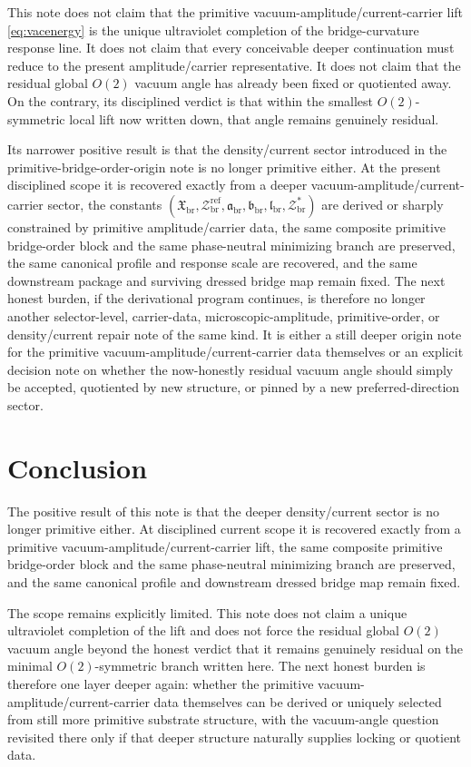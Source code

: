 \documentclass[11pt]{article}
\newcommand{\RespDeepDensityRef}{\mathcal Z_{\mathrm{br}}^{\mathrm{ref}}}
\newcommand{\RespDeepDensityEq}{\mathcal Z_{\mathrm{br}}^{\ast}}
\newcommand{\RespDeepReadout}{\mathfrak X_{\mathrm{br}}}
\newcommand{\RespDeepTrack}{\mathfrak a_{\mathrm{br}}}
\newcommand{\RespDeepRelax}{\mathfrak b_{\mathrm{br}}}
\newcommand{\RespDeepWell}{\mathfrak l_{\mathrm{br}}}
\begin{document}
This note does not claim that the primitive vacuum-amplitude/current-carrier lift \eqref{eq:vacenergy} is the unique ultraviolet completion of the bridge-curvature response line. It does not claim that every conceivable deeper continuation must reduce to the present amplitude/carrier representative. It does not claim that the residual global \(O(2)\) vacuum angle has already been fixed or quotiented away. On the contrary, its disciplined verdict is that within the smallest \(O(2)\)-symmetric local lift now written down, that angle remains genuinely residual.

Its narrower positive result is that the density/current sector introduced in the primitive-bridge-order-origin note is no longer primitive either. At the present disciplined scope it is recovered exactly from a deeper vacuum-amplitude/current-carrier sector, the constants \((\RespDeepReadout,\RespDeepDensityRef,\RespDeepTrack,\RespDeepRelax,\RespDeepWell,\RespDeepDensityEq)\) are derived or sharply constrained by primitive amplitude/carrier data, the same composite primitive bridge-order block and the same phase-neutral minimizing branch are preserved, the same canonical profile and response scale are recovered, and the same downstream package and surviving dressed bridge map remain fixed. The next honest burden, if the derivational program continues, is therefore no longer another selector-level, carrier-data, microscopic-amplitude, primitive-order, or density/current repair note of the same kind. It is either a still deeper origin note for the primitive vacuum-amplitude/current-carrier data themselves or an explicit decision note on whether the now-honestly residual vacuum angle should simply be accepted, quotiented by new structure, or pinned by a new preferred-direction sector.

\section{Conclusion}

The positive result of this note is that the deeper density/current sector is no longer primitive either. At disciplined current scope it is recovered exactly from a primitive vacuum-amplitude/current-carrier lift, the same composite primitive bridge-order block and the same phase-neutral minimizing branch are preserved, and the same canonical profile and downstream dressed bridge map remain fixed.

The scope remains explicitly limited. This note does not claim a unique ultraviolet completion of the lift and does not force the residual global \(O(2)\) vacuum angle beyond the honest verdict that it remains genuinely residual on the minimal \(O(2)\)-symmetric branch written here. The next honest burden is therefore one layer deeper again: whether the primitive vacuum-amplitude/current-carrier data themselves can be derived or uniquely selected from still more primitive substrate structure, with the vacuum-angle question revisited there only if that deeper structure naturally supplies locking or quotient data.
\end{document}
